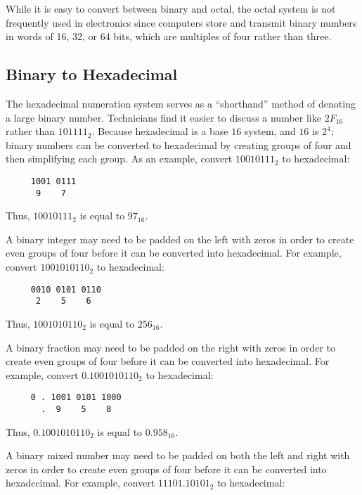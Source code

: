 While it is easy to convert between binary and octal, the octal system is not frequently used in electronics since computers store and transmit binary numbers in words of 16, 32, or 64 bits, which are multiples of four rather than three. 

\subsection{Binary to Hexadecimal}
\label{MF:sub:binary_to_hexadecimal}
The hexadecimal numeration system serves as a ``shorthand'' method of denoting a large binary number. Technicians find it easier to discuss a number like $ 2F_{16} $ rather than $ 101111_2 $. Because hexadecimal is a base $ 16 $ system, and $ 16 $ is $ 2^4 $; binary numbers can be converted to hexadecimal by creating groups of four and then simplifying each group. As an example, convert $ 10010111_2 $ to hexadecimal: 

\begin{verbatim}
     1001 0111
      9    7 
\end{verbatim}

Thus, $ 10010111_2 $ is equal to $ 97_{16} $.

A binary integer may need to be padded on the left with zeros in order to create even groups of four before it can be converted into hexadecimal. For example, convert $ 1001010110_2 $ to hexadecimal: 

\begin{verbatim}
     0010 0101 0110
      2    5    6 
\end{verbatim}

Thus, $ 1001010110_2 $ is equal to $ 256_{16} $. 

A binary fraction may need to be padded on the right with zeros in order to create even groups of four before it can be converted into hexadecimal. For example, convert $ 0.1001010110_2 $ to hexadecimal: 

\begin{verbatim}
     0 . 1001 0101 1000
       .  9    5    8 
\end{verbatim}

Thus, $ 0.1001010110_2 $ is equal to $ 0.958_{16} $. 

A binary mixed number may need to be padded on both the left and right with zeros in order to create even groups of four before it can be converted into hexadecimal. For example, convert $ 11101.10101_2 $ to hexadecimal: 

